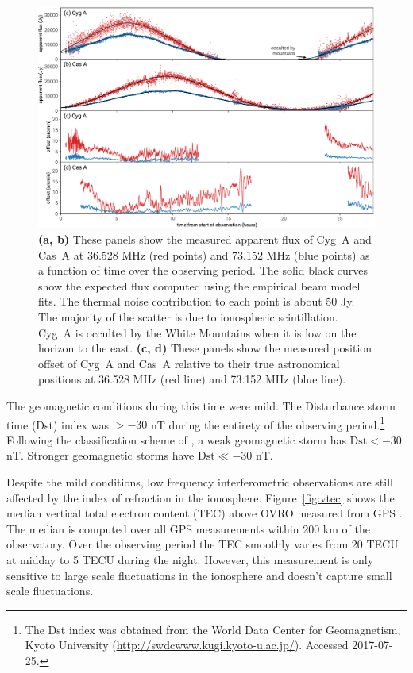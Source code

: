 \documentclass[twocolumn]{aastex61}
\begin{document}
\begin{figure}[t]
    \includegraphics[width=\textwidth]{figures/scintillation-refraction/scintillation-refraction}
    \caption{
        \textbf{(a, b)} These panels show the measured apparent flux of Cyg~A and Cas~A at 36.528
        MHz (red points) and 73.152 MHz (blue points) as a function of time over the observing
        period. The solid black curves show the expected flux computed using the empirical beam
        model fits. The thermal noise contribution to each point is about 50 Jy. The majority of the
        scatter is due to ionospheric scintillation.  Cyg~A is occulted by the White Mountains when
        it is low on the horizon to the east.
        \textbf{(c, d)} These panels show the measured position offset of Cyg~A and Cas~A relative
        to their true astronomical positions at 36.528 MHz (red line) and 73.152 MHz (blue line).
    }
    \label{fig:scintillation}
\end{figure}

The geomagnetic conditions during this time were mild. The Disturbance storm time (Dst) index was
$>-30$ nT during the entirety of the observing period.\footnote{
    The Dst index was obtained from the World Data Center for Geomagnetism, Kyoto University
    (\url{http://swdcwww.kugi.kyoto-u.ac.jp/}). Accessed 2017-07-25.
}
Following the classification scheme of \citet{2008GMS...181.....K}, a weak geomagnetic storm has
$\text{Dst} < -30$ nT. Stronger geomagnetic storms have $\text{Dst} \ll -30$ nT.

Despite the mild conditions, low frequency interferometric observations are still affected by the
index of refraction in the ionosphere.  Figure~\ref{fig:vtec} shows the median vertical total
electron content (TEC) above OVRO measured from GPS \citep{1999JASTP..61.1205I}. The median is
computed over all GPS measurements within 200 km of the observatory. Over the observing period the
TEC smoothly varies from 20 TECU at midday to 5 TECU during the night. However, this measurement is
only sensitive to large scale fluctuations in the ionosphere and doesn't capture small scale
fluctuations.
\end{document}
